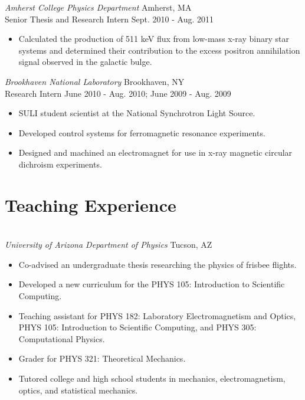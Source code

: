 \documentclass{res}
\begin{document}
\begin{resume}
{\sl Amherst College Physics Department} \hfill Amherst, MA\\
Senior Thesis and Research Intern \hfill Sept. 2010 - Aug. 2011
\begin{itemize} \itemsep -2pt
	\item Calculated the production of 511 keV flux from low-mass x-ray binary star systems and determined their contribution to the excess positron annihilation signal observed in the galactic bulge.%
\end{itemize}

{\sl Brookhaven National Laboratory} \hfill Brookhaven, NY\\
Research Intern \hfill June 2010 - Aug. 2010; June 2009 - Aug. 2009
\begin{itemize} \itemsep -2pt
  \item SULI student scientist at the National Synchrotron Light Source.%
  \item Developed control systems for ferromagnetic resonance experiments.
  \item Designed and machined an electromagnet for use in x-ray magnetic circular dichroism experiments. %
\end{itemize} 

\section{Teaching Experience} 
\vspace{-8pt}
\hrulefill\\
{\it University of Arizona Department of Physics} \hfill Tucson, AZ
\begin{itemize} \itemsep -2pt
  \item Co-advised an undergraduate thesis researching the physics of frisbee flights.
  \item Developed a new curriculum for the PHYS 105: Introduction to Scientific Computing.
  \item Teaching assistant for PHYS 182: Laboratory Electromagnetism and Optics, PHYS 105: Introduction to Scientific Computing, and PHYS 305: Computational Physics.
  \item Grader for PHYS 321: Theoretical Mechanics.
  \item Tutored college and high school students in mechanics, electromagnetism, optics, and statistical mechanics.
\end{itemize}


\end{resume}
\end{document}
